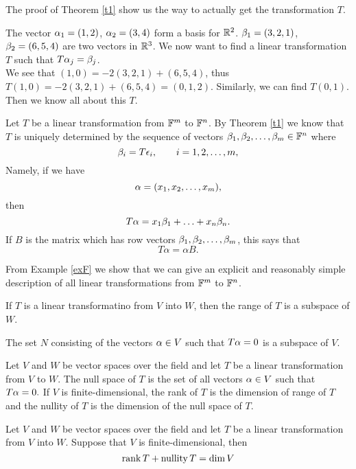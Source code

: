 \documentclass{mynotes}
\begin{document}
\begin{remark}
The proof of Theorem \ref{t1} show us the way to actually get the transformation $T$. 
\end{remark}
\begin{problem}
The vector $\alpha_1 = (1,2)$, $\alpha_2 = (3, 4)$ form a basis for $\mathbb{R}^2$. $\beta_1 = (3,2,1)$, $\beta_2 = (6,5,4)$ are two vectors in $\mathbb{R}^3$. We now want to find a linear transformation $T$ such that $T\alpha_j=\beta_j$.\\
We see that $(1,0) = -2(3,2,1) +(6,5,4)$, thus $T(1,0) = -2(3,2,1)+(6,5,4) = (0,1,2)$. Similarly, we can find $T(0,1)$. Then we know all about this $T$.
\end{problem}
\begin{example}\label{exF}
Let $T$ be a linear transformation from $\mathbb{F}^m$ to $\mathbb{F}^n$. By Theorem \ref{t1} we know that $T$ is uniquely determined by the sequence of vectors $\beta_1,\beta_2,\ldots,\beta_m\in\mathbb{F}^n$ where $$\beta_i = T\epsilon_i, \qquad i = 1,2,\ldots, m,$$Namely, if we have $$\alpha = (x_1,x_2,\ldots,x_m),$$then $$T\alpha = x_1\beta_1+\ldots+x_n\beta_n.$$If $B$ is the \mbyn{} matrix which has row vectors $\beta_1,\beta_2,\ldots,\beta_m$, this says that $$T\alpha = \alpha B.$$
\end{example}
\begin{remark}
From Example \ref{exF} we show that we can give an explicit and reasonably simple description of all linear transformations from $\mathbb{F}^m$ to $\mathbb{F}^n$.
\end{remark}
\begin{remark}If $T$ is a linear transformatino from $V$ into $W$, then the range of $T$ is a subspace of $W$.\end{remark}
\begin{remark}The set $N$ consisting of the vectors $\alpha\in V$ such that $T\alpha = 0$ is a subspace of $V$.
\end{remark}
\begin{definition}
Let $V$ and $W$ be vector spaces over the field \F{} and let $T$ be a linear transformation from $V$ to $W$. The null space of $T$ is the set of all vectors $\alpha\in V$ such that $T\alpha = 0.$
If $V$ is finite-dimensional, the rank of $T$ is the dimension of range of $T$ and the nullity of $T$ is the dimension of the null space of $T$.
\end{definition}
\begin{theorem}
Let $V$ and $W$ be vector spaces over the field \F{} and let $T$ be a linear transformation from $V$ into $W$. Suppose that $V$ is finite-dimensional, then $$\mathrm{rank}\,{T} + \mathrm{nullity}\,{T} = \dim V$$
\end{theorem}
\end{document}
